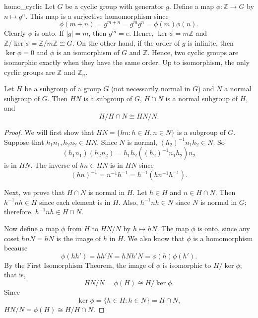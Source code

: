 \begin{center}

\end{center}

 
 
\begin{example}{homo_cyclic}
Let $G$ be a cyclic group with generator $g$. Define a map $\phi :
{\mathbb Z} \rightarrow G$ by $n \mapsto g^n$.  This map is a surjective
homomorphism since  
\[
\phi( m + n) = g^{m+n} = g^m g^n = \phi(m) \phi(n).
\]
Clearly $\phi$ is onto. If $|g| = m$, then  $g^m = e$. Hence, $\ker
\phi = m {\mathbb Z}$ and ${\mathbb Z} / \ker \phi =  {\mathbb Z} / m {\mathbb Z}
\cong G$. On the other hand, if the order of $g$ is infinite, then
$\ker \phi = 0$ and $\phi$ is an isomorphism of $G$ and ${\mathbb Z}$.
Hence, two cyclic groups are isomorphic exactly when they have the
same order. Up to isomorphism, the only cyclic groups are ${\mathbb Z}$
and ${\mathbb Z}_n$. 
\end{example}
 
 
\begin{theorem}\label{homomorph:theorem:2nd_isomorph}
Let  $H$ be a subgroup of a group $G$ (not necessarily normal in $G$)
and $N$ a normal subgroup of $G$.  Then $HN$ is a subgroup of $G$,
$H \cap N$ is a normal subgroup of $H$, and 
\[
H / H \cap N \cong HN /N.
\]
\end{theorem}
 
 
\begin{proof}
We will first show that $HN = \{ hn : h \in H, n \in N \}$ is a
subgroup of $G$.  Suppose that  $h_1 n_1, h_2 n_2 \in HN$. Since 
$N$ is normal, $(h_2)^{-1} n_1 h_2 \in N$. So 
\[
(h_1 n_1)(h_2 n_2) = h_1 h_2 ( (h_2)^{-1} n_1 h_2 )n_2
\]
is in $HN$. The inverse of $hn \in HN$ is in $HN$ since
\[
( hn )^{-1} = n^{-1 } h^{-1} = h^{-1} (h n^{-1} h^{-1} ).
\]
 
 
Next, we prove that $H \cap N$ is normal in $H$. Let $h \in H$ and $n
\in H \cap N$. Then $h^{-1} n h \in H$ since each element is in $H$.
Also, $h^{-1} n h \in N$ since $N$ is normal in $G$; therefore,
$h^{-1} n h \in H \cap N$. 
 
 
Now define a map $\phi$ from $H$ to $ HN / N$ by $h \mapsto h N$. The
map $\phi$ is onto, since any coset $h n N = h N$ is the image of $h$
in $H$. We also know that $\phi$ is a homomorphism because 
\[
\phi( h  h')  = h h' N =  h N h' N =  \phi( h ) \phi( h').
\]
By the First Isomorphism Theorem, the image of $\phi$ is isomorphic to
$H / \ker \phi$; that is,
\[
HN/N = \phi(H) \cong H / \ker \phi.
\]
Since
\[
\ker \phi = \{ h \in H : h \in N \} = H \cap N,
\]
$HN/N = \phi(H) \cong H / H \cap N$.
\end{proof}
 
